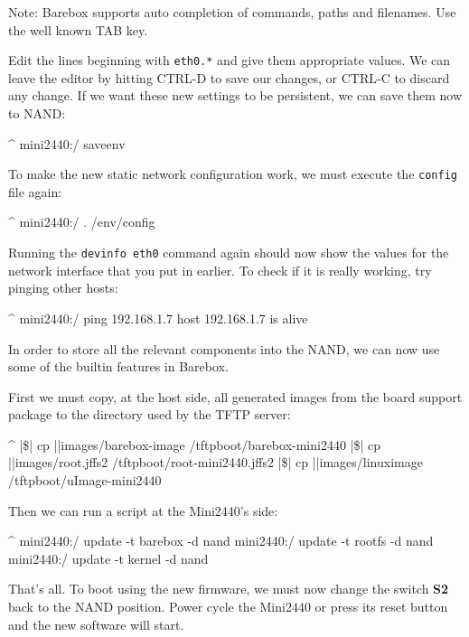 Note: Barebox supports auto completion of commands, paths and filenames. Use
the well known TAB key.

Edit the lines beginning with \texttt{eth0.*} and give them appropriate values.
We can leave the editor by hitting CTRL-D to save our changes, or CTRL-C to
discard any change. If we want these new settings to be persistent, we can save
them now to NAND:

\begin{ptxshell}[escapechar=|]{^}
mini2440:/ saveenv
\end{ptxshell}

To make the new static network configuration work, we must execute the
\texttt{config} file again:

\begin{ptxshell}[escapechar=|]{^}
mini2440:/ . /env/config
\end{ptxshell}

Running the \texttt{devinfo eth0} command again should now show the values for
the network interface that you put in earlier. To check if it is really working,
try pinging other hosts:

\begin{ptxshell}[escapechar=|]{^}
mini2440:/ ping 192.168.1.7
host 192.168.1.7 is alive
\end{ptxshell}

In order to store all the relevant components into the NAND, we can now use
some of the builtin features in Barebox.

First we must copy, at the host side, all generated images from the board support
package to the directory used by the TFTP server:

\begin{ptxshell}[escapechar=|]{^}
|\$| cp |\ptxdistPlatformDir |images/barebox-image /tftpboot/barebox-mini2440
|\$| cp |\ptxdistPlatformDir |images/root.jffs2 /tftpboot/root-mini2440.jffs2
|\$| cp |\ptxdistPlatformDir |images/linuximage /tftpboot/uImage-mini2440
\end{ptxshell}

Then we can run a script at the Mini2440's side:

\begin{ptxshell}[escapechar=|]{^}
mini2440:/ update -t barebox -d nand
mini2440:/ update -t rootfs -d nand
mini2440:/ update -t kernel -d nand
\end{ptxshell}

That's all. To boot using the new firmware, we must now change the switch
\textbf{S2} back to the NAND position. Power cycle the Mini2440 or press its
reset button and the new software will start.

